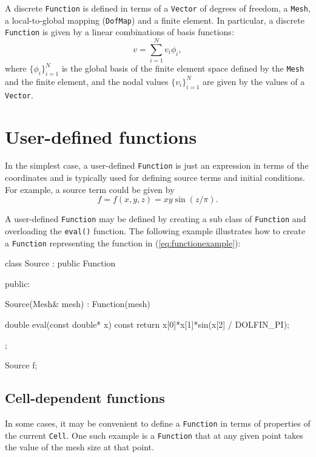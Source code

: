 A discrete \texttt{Function} is defined in terms of a
\texttt{Vector} of degrees of freedom, a \texttt{Mesh}, a
local-to-global mapping (\texttt{DofMap}) and a finite element.  In
particular, a discrete \texttt{Function} is given by a linear
combinations of basis functions:
\begin{equation}
  v = \sum_{i=1}^{N} v_i \phi_{i},
\end{equation}
where $\{\phi_i\}_{i=1}^N$ is the global basis of the finite element
space defined by the \texttt{Mesh} and the finite element, and
the nodal values $\{v_i\}_{i=1}^N$ are given by the values of a
\texttt{Vector}.

\section{User-defined functions}

In the simplest case, a user-defined \texttt{Function} is just an
expression in terms of the coordinates and is typically used for
defining source terms and initial conditions. For example, a source
term could be given by
\begin{equation} \label{eq:functionexample}
  f = f(x, y, z) = xy \sin(z / \pi).
\end{equation}

A user-defined \texttt{Function} may be defined by creating a sub
class of \texttt{Function} and overloading the \texttt{eval()}
function.  The following example illustrates how to create a
\texttt{Function} representing the function in
(\ref{eq:functionexample}):
\begin{code}
class Source : public Function
{
public:
    
  Source(Mesh& mesh) : Function(mesh) {}

  double eval(const double* x) const
  {
    return x[0]*x[1]*sin(x[2] / DOLFIN_PI);
  }

};

Source f;
\end{code}


\subsection{Cell-dependent functions}

In some cases, it may be convenient to define a \texttt{Function} in
terms of properties of the current \texttt{Cell}. One such example is
a \texttt{Function} that at any given point takes the value of the
mesh size at that point.


